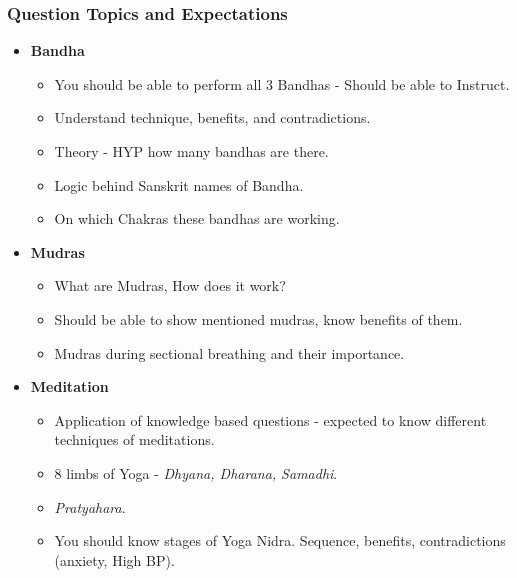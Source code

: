 \begin{frame}[fragile]\frametitle{Question Topics and Expectations}
    \begin{itemize}
	

        \item \textbf{Bandha}
        \begin{itemize}
            \item You should be able to perform all 3 Bandhas - Should be able to Instruct.
            \item Understand technique, benefits, and contradictions.
            \item Theory - HYP how many bandhas are there.
            \item Logic behind Sanskrit names of Bandha.
            \item On which Chakras these bandhas are working.
        \end{itemize}
		
		        \item \textbf{Mudras}
        \begin{itemize}
            \item What are Mudras, How does it work?
            \item Should be able to show mentioned mudras, know benefits of them.
            \item Mudras during sectional breathing and their importance.
        \end{itemize}
        \item \textbf{Meditation}
        \begin{itemize}
            \item Application of knowledge based questions - expected to know different techniques of meditations.
            \item 8 limbs of Yoga - \textit{Dhyana, Dharana, Samadhi}.
            \item \textit{Pratyahara}.
            \item You should know stages of Yoga Nidra. Sequence, benefits, contradictions (anxiety, High BP).
        \end{itemize}
    \end{itemize}
\end{frame}

